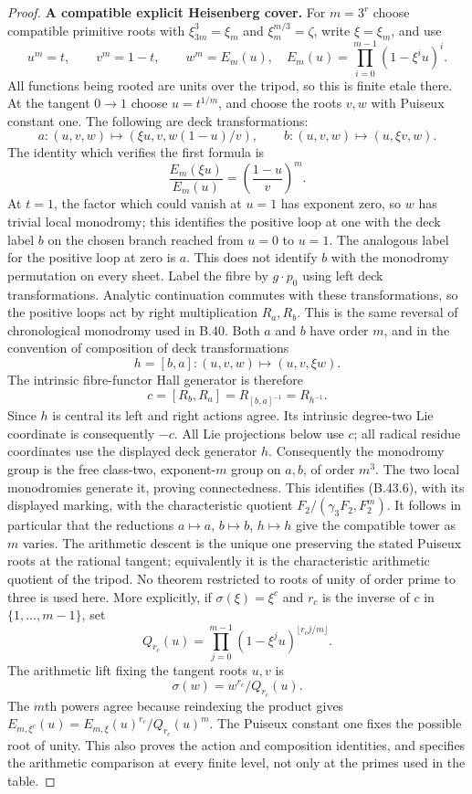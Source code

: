 \begin{proof}
\par\smallskip\noindent\textbf{A compatible explicit Heisenberg cover.}
For $m=3^r$ choose compatible primitive roots with
$\xi_{3m}^3=\xi_m$ and $\xi_m^{m/3}=\zeta$, write
$\xi=\xi_m$, and use
\[
 u^m=t,\qquad v^m=1-t,\qquad
 w^m=E_m(u),\quad
 E_m(u)=\prod_{i=0}^{m-1}(1-\xi^iu)^i.                     \tag{B.43.6}
\]
All functions being rooted are units over the tripod, so
this is finite etale there.  At the tangent $0\!\to\!1$
choose $u=t^{1/m}$, and choose the roots $v,w$ with
Puiseux constant one.  The following are deck transformations:
\[
 a:(u,v,w)\mapsto(\xi u,v,w(1-u)/v),\qquad
 b:(u,v,w)\mapsto(u,\xi v,w).                              \tag{B.43.7}
\]
The identity which verifies the first formula is
\[
 \frac{E_m(\xi u)}{E_m(u)}
       =\left(\frac{1-u}{v}\right)^m.                     \tag{B.43.8}
\]
At $t=1$, the factor which could vanish at $u=1$ has
exponent zero, so $w$ has trivial local monodromy; this
identifies the positive loop at one with the deck label
$b$ on the chosen branch reached from $u=0$ to $u=1$.
The analogous label for the positive loop at zero is $a$.
This does not identify $b$ with the monodromy permutation
on every sheet.  Label the fibre by $g\cdot p_0$ using
left deck transformations.  Analytic continuation commutes
with these transformations, so the positive loops act by
right multiplication $R_a,R_b$.  This is the same reversal
of chronological monodromy used in B.40.
Both $a$ and $b$ have order $m$, and in the convention of
composition of deck transformations
\[
 h=[b,a]:(u,v,w)\mapsto(u,v,\xi w).                        \tag{B.43.9}
\]
The intrinsic fibre-functor Hall generator is therefore
\[
 c=[R_b,R_a]=R_{[b,a]^{-1}}=R_{h^{-1}}.                     \tag{B.43.9a}
\]
Since $h$ is central its left and right actions agree.
Its intrinsic degree-two Lie coordinate is consequently
$-c$. All Lie projections below use $c$; all radical
residue coordinates use the displayed deck generator $h$.
Consequently the monodromy group is the free class-two,
exponent-$m$ group on $a,b$, of order $m^3$.
The two local monodromies generate it, proving connectedness.
This identifies (B.43.6), with its displayed marking, with
the characteristic quotient
$F_2/(\gamma_3F_2,F_2^m)$.
It follows in particular that the reductions
$a\mapsto a$, $b\mapsto b$, $h\mapsto h$ give the compatible
tower as $m$ varies.  The arithmetic descent is the unique
one preserving the stated Puiseux roots at the rational
tangent; equivalently it is the characteristic arithmetic
quotient of the tripod.  No theorem restricted to roots of
unity of order prime to three is used here.
More explicitly, if $\sigma(\xi)=\xi^c$ and $r_c$ is the
inverse of $c$ in $\{1,\ldots,m-1\}$, set
\[
 Q_{r_c}(u)=\prod_{j=0}^{m-1}
          (1-\xi^ju)^{\lfloor r_cj/m\rfloor}.
\]
The arithmetic lift fixing the tangent roots $u,v$ is
\[
 \sigma(w)=w^{r_c}/Q_{r_c}(u).                             \tag{B.43.6a}
\]
The $m$th powers agree because reindexing the product
gives $E_{m,\xi^c}(u)=E_{m,\xi}(u)^{r_c}/Q_{r_c}(u)^m$.
The Puiseux constant one fixes the possible root of unity.
This also proves the action and composition identities,
and specifies the arithmetic comparison at every finite
level, not only at the primes used in the table.


\end{proof}
